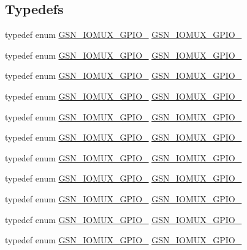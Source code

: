 \subsection*{Typedefs}
\begin{DoxyCompactItemize}
\item 
typedef enum \hyperlink{a00519_ab8e14637cbb01784302c471c32135363}{GSN\_\-IOMUX\_\-GPIO\_} \hyperlink{a00519_ade0273b085246199565e368850baa6c2}{GSN\_\-IOMUX\_\-GPIO\_}
\item 
typedef enum \hyperlink{a00519_a2482cd55eb57e3f76b1ce4ac8b2c95c6}{GSN\_\-IOMUX\_\-GPIO\_} \hyperlink{a00519_ab58ab2c9132006fae55408efa7d62eec}{GSN\_\-IOMUX\_\-GPIO\_}
\item 
typedef enum \hyperlink{a00519_a4c309e7a91ab48d86106485591b85ba7}{GSN\_\-IOMUX\_\-GPIO\_} \hyperlink{a00519_ab335ffbc8ee42580bea9aabe5116c1d3}{GSN\_\-IOMUX\_\-GPIO\_}
\item 
typedef enum \hyperlink{a00519_ad2c6d559f4b898b37fd1858edd2febb1}{GSN\_\-IOMUX\_\-GPIO\_} \hyperlink{a00519_a5ec3b7b6d1ffeb640106117afd22bc74}{GSN\_\-IOMUX\_\-GPIO\_}
\item 
typedef enum \hyperlink{a00519_ae5090c2bf0f08a5bb6f0fac6e00d8bd5}{GSN\_\-IOMUX\_\-GPIO\_} \hyperlink{a00519_ae1fb823e1175dbb9e3ac13afb94ef32b}{GSN\_\-IOMUX\_\-GPIO\_}
\item 
typedef enum \hyperlink{a00519_ae788d1528887c2751ee9d5c4892ef281}{GSN\_\-IOMUX\_\-GPIO\_} \hyperlink{a00519_aa788aac64fd76e60de0f7108d60808ea}{GSN\_\-IOMUX\_\-GPIO\_}
\item 
typedef enum \hyperlink{a00519_a44939fa9f5f560069cce43fb9e7583f1}{GSN\_\-IOMUX\_\-GPIO\_} \hyperlink{a00519_afc8d87b1fc003564a82a871280921d2b}{GSN\_\-IOMUX\_\-GPIO\_}
\item 
typedef enum \hyperlink{a00519_a50dbf41b8db41ae657f19b8445053a72}{GSN\_\-IOMUX\_\-GPIO\_} \hyperlink{a00519_a9f718135b692a4f2f08357282966b898}{GSN\_\-IOMUX\_\-GPIO\_}
\item 
typedef enum \hyperlink{a00519_ab7d7b1750ad31046bc7faa198b81cbc8}{GSN\_\-IOMUX\_\-GPIO\_} \hyperlink{a00519_a5972e66ae1c647b3d1fc2788ec8b9396}{GSN\_\-IOMUX\_\-GPIO\_}
\item 
typedef enum \hyperlink{a00519_a43a8cf0b2eb55e0ff26d2b455b20c9fe}{GSN\_\-IOMUX\_\-GPIO\_} \hyperlink{a00519_a705ad4ccb2951abf027f8ade03097f07}{GSN\_\-IOMUX\_\-GPIO\_}
\item 
typedef enum \hyperlink{a00519_a56c91a56c00dd218c4082263705bfb9c}{GSN\_\-IOMUX\_\-GPIO\_} \hyperlink{a00519_aa3557aceca1d57020b7bcfe6cfd9ed8e}{GSN\_\-IOMUX\_\-GPIO\_}

\end{DoxyCompactItemize}
